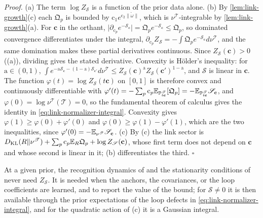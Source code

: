 \noindent\emph{Proof.}
(a) The term $\log Z_{\mathscr S}$ is a function of the prior data alone. (b) By \cref{lem:link-growth}(c) each
$\mathfrak Q_p$ is bounded by $\mathrm c_1e^{\mathrm c_2\lVert\mathring\omega\rVert}$, which is
$\nu^{\mathscr T}$-integrable by \cref{lem:link-growth}(a). For $\mathbf c$ in the orthant,
$\lvert\partial_{\mathrm c_p}e^{-\mathscr S_{\mathbf c}}\rvert=\mathfrak Q_pe^{-\mathscr S_{\mathbf c}}\leq\mathfrak Q_p$, so
dominated convergence differentiates under the integral,
$\partial_{\mathrm c_p}Z_{\mathscr S}=-\int\mathfrak Q_pe^{-\mathscr S_{\mathbf c}}d\nu^{\mathscr T}$, and the same
domination makes these partial derivatives continuous. Since $Z_{\mathscr S}(\mathbf c)>0$
((a)), dividing gives the stated derivative. Convexity is H\"older's
inequality: for $\mathrm a\in(0,1)$,
$\int e^{-\mathrm a\mathscr S_{\mathbf c}-(1-\mathrm a)\mathscr S_{\mathbf c'}}d\nu^{\mathscr T}\leq Z_{\mathscr S}(\mathbf c)^{\mathrm a}Z_{\mathscr S}(\mathbf c')^{1-\mathrm a}$,
and $\mathscr S$ is linear in $\mathbf c$. The function $\varphi(t)=\log Z_{\mathscr S}(t\mathbf c)$ on $[0,1]$
is therefore convex and continuously differentiable with
$\varphi'(t)=-\sum_p\mathrm c_p\mathbb E_{\mathbb P^{\mathscr T}_{t\mathbf c}}[\mathfrak Q_p]=-\mathbb E_{\mathbb P^{\mathscr T}_{t\mathbf c}}\mathscr S_{\mathbf c}$,
and $\varphi(0)=\log\nu^{\mathscr T}(\mathscr T)=0$, so the fundamental theorem of calculus gives the
identity in \eqref{eq:link-normalizer-integral}. Convexity gives $\varphi(1)\geq\varphi(0)+\varphi'(0)$ and
$\varphi(0)\geq\varphi(1)-\varphi'(1)$, which are the two inequalities, since
$\varphi'(0)=-\mathbb E_{\nu^{\mathscr T}}\mathscr S_{\mathbf c}$. (c) By
(c) the link sector is
$D_{\mathrm{KL}}(R\Vert\nu^{\mathscr T})+\sum_p\mathrm c_p\mathbb E_R\mathfrak Q_p+\log Z_{\mathscr S}(\mathbf c)$, whose first term does not
depend on $\mathbf c$ and whose second is linear in it; (b) differentiates the third. \hfill$\square$

At a given prior, the recognition dynamics of  and the stationarity
conditions of  never need $Z_{\mathscr S}$. It is needed when the anchors,
the covariances, or the loop coefficients are learned, and to report the value of the bound; for
$\mathscr S\neq0$ it is then available through the prior expectations of the loop defects in
\eqref{eq:link-normalizer-integral}, and for the quadratic action of
(c) it is a Gaussian integral.

